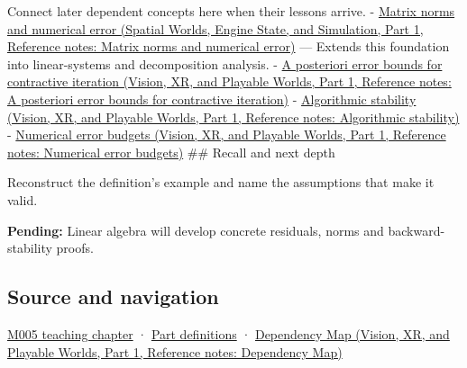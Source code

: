 \hypertarget{appendix-a7fbaf6d1b1c-used-by}{}

Connect later dependent concepts here when their lessons arrive. - \href{../05-Spatial-Worlds-Engine-State-and-Simulation-P01/main.pdf\#appendix-f8657bac66e5}{Matrix norms and numerical error (Spatial Worlds, Engine State, and Simulation, Part 1, Reference notes: Matrix norms and numerical error)} --- Extends this foundation into linear-systems and decomposition analysis. - \href{../07-Vision-XR-and-Playable-Worlds-P01/main.pdf\#appendix-d83b0ad1be7f}{A posteriori error bounds for contractive iteration (Vision, XR, and Playable Worlds, Part 1, Reference notes: A posteriori error bounds for contractive iteration)} - \href{../07-Vision-XR-and-Playable-Worlds-P01/main.pdf\#appendix-aa2bf0d79639}{Algorithmic stability (Vision, XR, and Playable Worlds, Part 1, Reference notes: Algorithmic stability)} - \href{../07-Vision-XR-and-Playable-Worlds-P01/main.pdf\#appendix-31b8c295e05f}{Numerical error budgets (Vision, XR, and Playable Worlds, Part 1, Reference notes: Numerical error budgets)} \#\# Recall and next depth

Reconstruct the definition's example and name the assumptions that make it valid.

\textbf{Pending:} Linear algebra will develop concrete residuals, norms and backward-stability proofs.

\subsection{Source and navigation}\label{appendix-a7fbaf6d1b1c-source-and-navigation}

\hypertarget{appendix-a7fbaf6d1b1c-source-and-navigation}{}

\hyperref[01-foundations-i-ch001-when-arithmetic-meets-uncertainty]{M005 teaching chapter} · \hyperref[appendix-fd090d982a15-m005---parts-77-88]{Part definitions} · \href{../07-Vision-XR-and-Playable-Worlds-P01/main.pdf\#appendix-4ad47bdd269a}{Dependency Map (Vision, XR, and Playable Worlds, Part 1, Reference notes: Dependency Map)}
